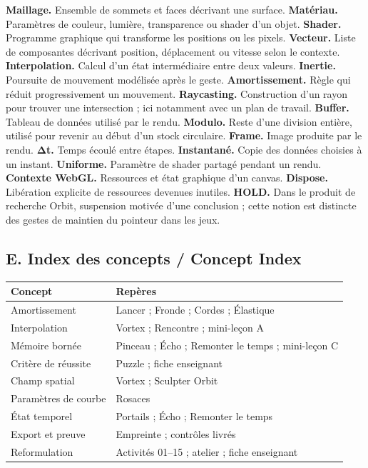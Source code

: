 \documentclass[
  canadien,
  11pt,
  letterpaper,
]{article}
\newcounter{none} %
\begin{document}
\textbf{Maillage.} Ensemble de sommets et faces décrivant une surface.
\textbf{Matériau.} Paramètres de couleur, lumière, transparence ou
shader d'un objet. \textbf{Shader.} Programme graphique qui transforme
les positions ou les pixels. \textbf{Vecteur.} Liste de composantes
décrivant position, déplacement ou vitesse selon le contexte.
\textbf{Interpolation.} Calcul d'un état intermédiaire entre deux
valeurs. \textbf{Inertie.} Poursuite de mouvement modélisée après le
geste. \textbf{Amortissement.} Règle qui réduit progressivement un
mouvement. \textbf{Raycasting.} Construction d'un rayon pour trouver une
intersection ; ici notamment avec un plan de travail. \textbf{Buffer.}
Tableau de données utilisé par le rendu. \textbf{Modulo.} Reste d'une
division entière, utilisé pour revenir au début d'un stock circulaire.
\textbf{Frame.} Image produite par le rendu. \textbf{Δt.} Temps écoulé
entre étapes. \textbf{Instantané.} Copie des données choisies à un
instant. \textbf{Uniforme.} Paramètre de shader partagé pendant un
rendu. \textbf{Contexte WebGL.} Ressources et état graphique d'un
canvas. \textbf{Dispose.} Libération explicite de ressources devenues
inutiles. \textbf{HOLD.} Dans le produit de recherche Orbit, suspension
motivée d'une conclusion ; cette notion est distincte des gestes de
maintien du pointeur dans les jeux.

\subsection{E. Index des concepts / Concept
Index}\label{e.-index-des-concepts-concept-index}

{\def\LTcaptype{none} %
\begin{longtable}[]{@{}ll@{}}
\toprule\noalign{}
Concept & Repères \\
\midrule\noalign{}
\endhead
\bottomrule\noalign{}
\endlastfoot
Amortissement & Lancer ; Fronde ; Cordes ; Élastique \\
Interpolation & Vortex ; Rencontre ; mini-leçon A \\
Mémoire bornée & Pinceau ; Écho ; Remonter le temps ; mini-leçon C \\
Critère de réussite & Puzzle ; fiche enseignant \\
Champ spatial & Vortex ; Sculpter Orbit \\
Paramètres de courbe & Rosaces \\
État temporel & Portails ; Écho ; Remonter le temps \\
Export et preuve & Empreinte ; contrôles livrés \\
Reformulation & Activités 01--15 ; atelier ; fiche enseignant \\
\end{longtable}
}
\end{document}
